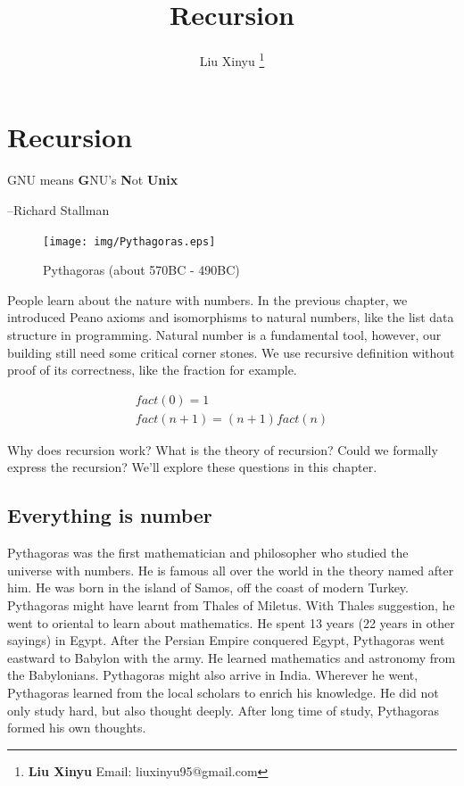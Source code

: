 \documentclass{article}
\begin{document}
\title{Recursion}

\author{Liu Xinyu
\thanks{{\bfseries Liu Xinyu} \newline
  Email: liuxinyu95@gmail.com}}

\maketitle
\fi


\ifx\wholebook\relax
\chapter{Recursion}
\fi

\epigraph{GNU means \textbf{G}NU's \textbf{N}ot \textbf{Unix}}{--Richard Stallman}

\begin{figure}
 \centering
 \texttt{[image: img/Pythagoras.eps]}
 \captionsetup{labelformat=empty}
 \caption{Pythagoras (about 570BC - 490BC)}
 \label{fig:Pythagoras}
\end{figure}

People learn about the nature with numbers. In the previous chapter, we introduced Peano axioms and isomorphisms to natural numbers, like the list data structure in programming. Natural number is a fundamental tool, however, our building still need some critical corner stones. We use recursive definition without proof of its correctness, like the fraction for example.

\[
\begin{array}{l}
fact(0) = 1 \\
fact(n + 1) = (n + 1) fact(n)
\end{array}
\]

Why does recursion work? What is the theory of recursion? Could we formally express the recursion? We'll explore these questions in this chapter.

\section{Everything is number}

Pythagoras was the first mathematician and philosopher who studied the universe with numbers. He is famous all over the world in the theory named after him. He was born in the island of Samos, off the coast of modern Turkey. Pythagoras might have learnt from Thales of Miletus. With Thales suggestion, he went to oriental to learn about mathematics. He spent 13 years (22 years in other sayings) in Egypt. After the Persian Empire conquered Egypt, Pythagoras went eastward to Babylon with the army. He learned mathematics and astronomy from the Babylonians. Pythagoras might also arrive in India. Wherever he went, Pythagoras learned from the local scholars to enrich his knowledge. He did not only study hard, but also thought deeply. After long time of study, Pythagoras formed his own thoughts\cite{HanXueTao16}.
\end{document}
